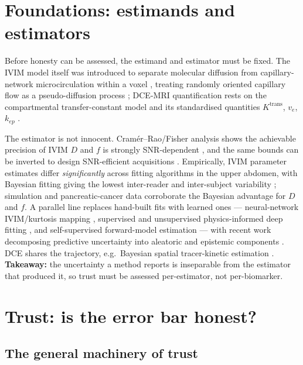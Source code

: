 \documentclass[review,number]{elsarticle}
\newcommand{\Ktrans}{K^{\mathrm{trans}}}
\begin{document}
\section{Foundations: estimands and estimators}
\label{sec:foundations}

Before honesty can be assessed, the estimand and estimator must be fixed. The IVIM model
itself was introduced to separate molecular diffusion from capillary-network
microcirculation within a voxel \cite{lebihan1986,lebihan1988}, treating randomly
oriented capillary flow as a pseudo-diffusion process \cite{lebihan2019}; DCE-MRI
quantification rests on the compartmental transfer-constant model \cite{tofts1991} and
its standardised quantities $\Ktrans$, $v_e$, $k_{ep}$ \cite{tofts1999}.

The estimator is not innocent. Cram\'er--Rao/Fisher analysis shows the achievable
precision of IVIM $D$ and $f$ is strongly SNR-dependent \cite{zhang2013}, and the same
bounds can be inverted to design SNR-efficient acquisitions \cite{jalnefjord2019}.
Empirically, IVIM parameter estimates differ \emph{significantly} across fitting
algorithms in the upper abdomen, with Bayesian fitting giving the lowest inter-reader
and inter-subject variability \cite{barbieri2016}; simulation \cite{while2017} and
pancreatic-cancer data \cite{gurneychampion2018} corroborate the Bayesian advantage for
$D$ and $f$. A parallel line replaces hand-built fits with learned ones ---
neural-network IVIM/kurtosis mapping \cite{bertleff2017}, supervised and unsupervised
physics-informed deep fitting \cite{barbieri2020,kaandorp2021}, and self-supervised
forward-model estimation \cite{vasylechko2021} --- with recent work decomposing
predictive uncertainty into aleatoric and epistemic components \cite{casali2025}. DCE
shares the trajectory, e.g.\ Bayesian spatial tracer-kinetic estimation
\cite{schmid2006}. \textbf{Takeaway:} the uncertainty a method reports is inseparable
from the estimator that produced it, so trust must be assessed per-estimator, not
per-biomarker.

\section{Trust: is the error bar honest?}
\label{sec:trust}

\subsection{The general machinery of trust}
\label{sec:trust-machinery}
\end{document}
